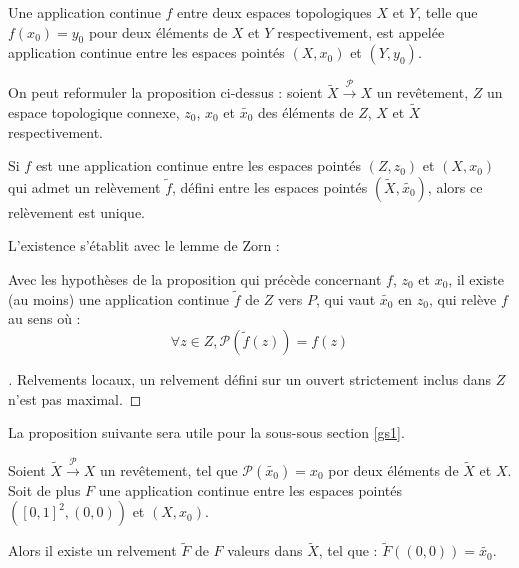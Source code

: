 \begin{rema}
Une application continue $f$ entre deux espaces topologiques $X$ et $Y$, telle que $f(x_0)=y_0$ %
pour deux \'el\'ements de $X$ et $Y$ respectivement, est appel\'ee application continue entre les espaces point\'es $(X,x_0)$ et $(Y,y_0)$.

\par
On peut reformuler la proposition ci-dessus : %
soient $\tilde{X}\overset{\mathcal{P}}{\longrightarrow} X$ un rev\^etement, $Z$ un espace topologique connexe, %
$z_0$, $x_0$ et $\tilde{x_0}$ des \'el\'ements de $Z$, $X$ et $\tilde{X}$ respectivement.

\par
Si $f$ est une application continue entre les espaces point\'es $(Z,z_0)$ et $(X,x_0)$ qui admet un rel\`evement $\tilde{f}$, %
d\'efini entre les espaces point\'es $(\tilde{X},\tilde{x_0})$, alors ce rel\`evement est unique.
\end{rema}

L'existence s'\'etablit avec le lemme de Zorn :

\begin{prop}
Avec les hypoth\`eses de la proposition qui pr\'ec\`ede concernant $f$, $z_0$ et $x_0$, il existe (au moins) une application continue $\tilde{f}$ de $Z$ vers $P$, %
qui vaut $\tilde{x_0}$ en $z_0$, qui rel\`eve $f$ au sens o\`u :
\[\forall z\in Z, \mathcal{P}(\tilde{f}(z))=f(z)\]
\end{prop}

\begin{proof}[\es]
Relvements locaux, un relvement d\'efini sur un ouvert strictement inclus dans $Z$ n'est pas maximal.
\end{proof}


La proposition suivante sera utile pour la sous-sous section \ref{gs1}.%

\begin{prop}\label{red2}
Soient $\tilde{X}\overset{\mathcal{P}}{\longrightarrow} X$ un rev\^etement, tel que $\mathcal{P}(\tilde{x_0})=x_0$ por deux \'el\'ements de $\tilde{X}$ et $X$. %
Soit de plus $F$ une application continue entre les espaces point\'es $([0,1]^2,(0,0))$ et $(X,x_0)$.

\par
Alors il existe un relvement $\tilde{F}$ de $F$  valeurs dans $\tilde{X}$, tel que : $\tilde{F}((0,0))=\tilde{x_0}$.
\end{prop}

